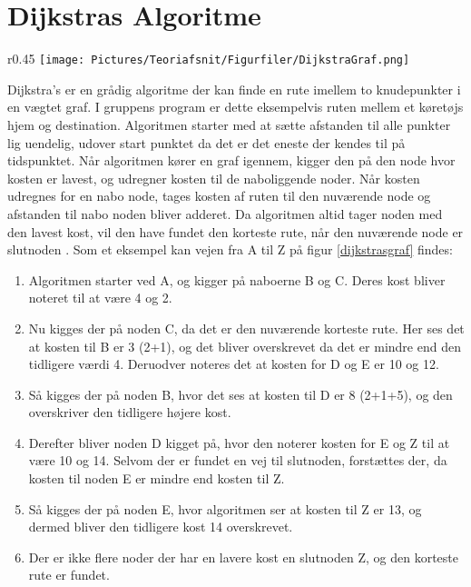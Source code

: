 \section{Dijkstras Algoritme}
\begin{wrapfigure}{r}{0.45\textwidth}
    \centering
  \texttt{[image: Pictures/Teoriafsnit/Figurfiler/DijkstraGraf.png]}
  \label{dijkstrasgraf}
  \caption{En vægtet graf}
\end{wrapfigure}

Dijkstra's er en grådig algoritme der kan finde en rute imellem to knudepunkter i en vægtet graf. I gruppens program er dette eksempelvis ruten mellem et køretøjs hjem og destination. Algoritmen starter med at sætte afstanden til alle punkter lig uendelig, udover start punktet da det er det eneste der kendes til på tidspunktet. Når algoritmen kører en graf igennem, kigger den på den node hvor kosten er lavest, og udregner kosten til de naboliggende noder. Når kosten udregnes for en nabo node, tages kosten af ruten til den nuværende node og afstanden til nabo noden bliver adderet. Da algoritmen altid tager noden med den lavest kost, vil den have fundet den korteste rute, når den nuværende node er slutnoden \cite[s. 681-684]{DMATBOGEN}. Som et eksempel kan vejen fra A til Z på figur \ref{dijkstrasgraf} findes:

\begin{enumerate}
\item Algoritmen starter ved A, og kigger på naboerne B og C. Deres kost bliver noteret til at være 4 og 2.
\item Nu kigges der på noden C, da det er den nuværende korteste rute. Her ses det at kosten til B er 3 (2+1), og det bliver overskrevet da det er mindre end den tidligere værdi 4. Deruodver noteres det at kosten for D og E er 10 og 12.
\item Så kigges der på noden B, hvor det ses at kosten til D er 8 (2+1+5), og den overskriver den tidligere højere kost.
\item Derefter bliver noden D kigget på, hvor den noterer kosten for E og Z til at være 10 og 14. Selvom der er fundet en vej til slutnoden, forstættes der, da kosten til noden E er mindre end kosten til Z.
\item Så kigges der på noden E, hvor algoritmen ser at kosten til Z er 13, og dermed bliver den tidligere kost 14 overskrevet.
\item Der er ikke flere noder der har en lavere kost en slutnoden Z, og den korteste rute er fundet.
\end{enumerate}


